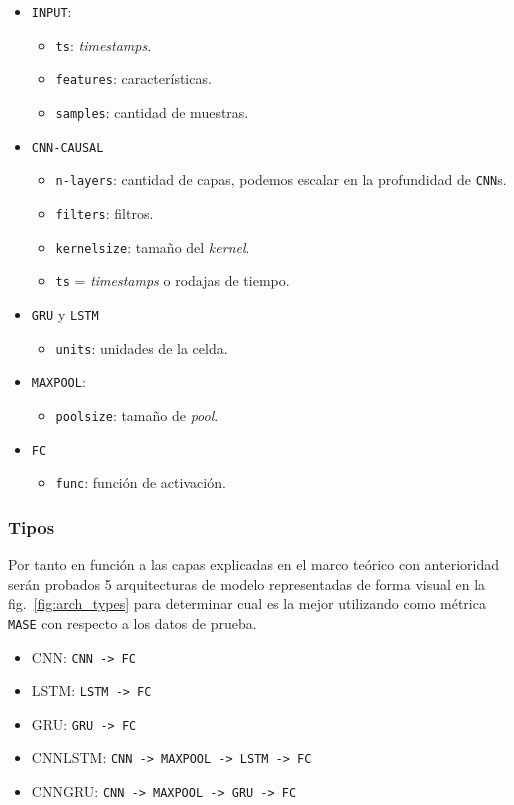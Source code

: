 \documentclass[a4paper,12pt]{article}
\begin{document}
\begin{itemize}
	\item \texttt{INPUT}:
	\begin{itemize}
		\item \texttt{ts}: \textit{timestamps}.
		\item \texttt{features}: características.
		\item \texttt{samples}: cantidad de muestras.
	\end{itemize}
	\item \texttt{CNN-CAUSAL}
	\begin{itemize}
		\item \texttt{n-layers}: cantidad de capas, podemos escalar en la profundidad de \texttt{CNN}s.
		\item \texttt{filters}: filtros.
		\item \texttt{kernelsize}: tamaño del \textit{kernel}.
		\item \texttt{ts} = \textit{timestamps} o rodajas de tiempo.
	\end{itemize}
	\item \texttt{GRU} y \texttt{LSTM}
	\begin{itemize}
		\item \texttt{units}: unidades de la celda.
	\end{itemize}
	\item \texttt{MAXPOOL}:
	\begin{itemize}		
		\item \texttt{poolsize}: tamaño de \textit{pool}.
	\end{itemize}
	\item \texttt{FC}
	\begin{itemize}
		\item \texttt{func}: función de activación.
	\end{itemize}
\end{itemize}

\subsubsection{Tipos}

Por tanto en función a las capas explicadas en el marco teórico con anterioridad serán probados 5 arquitecturas de modelo representadas de forma visual en la fig.~\ref{fig:arch_types} para determinar cual es la mejor utilizando como métrica \texttt{MASE} con respecto a los datos de prueba.

\begin{itemize}
	\item CNN: \texttt{CNN -> FC}
	\item LSTM: \texttt{LSTM -> FC}
	\item GRU: \texttt{GRU -> FC}
	\item CNNLSTM: \texttt{CNN -> MAXPOOL -> LSTM -> FC}
	\item CNNGRU: \texttt{CNN -> MAXPOOL -> GRU -> FC}
\end{itemize}
\end{document}
